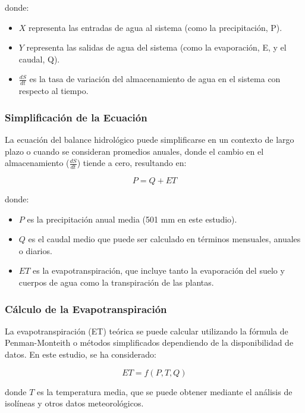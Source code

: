 \documentclass{article} %
\begin{document}
donde:

\begin{itemize}
    \item $X$ representa las entradas de agua al sistema (como la precipitación, P).
    \item $Y$ representa las salidas de agua del sistema (como la evaporación, E, y el caudal, Q).
    \item $\frac{dS}{dt}$ es la tasa de variación del almacenamiento de agua en el sistema con respecto al tiempo.
\end{itemize}

\subsubsection{Simplificación de la Ecuación}

La ecuación del balance hidrológico puede simplificarse en un contexto de largo plazo o cuando se consideran promedios anuales, donde el cambio en el almacenamiento ($\frac{dS}{dt}$) tiende a cero, resultando en:

\begin{equation}
    P = Q + ET
    \label{eq:evaporacion}
\end{equation}

donde:
\begin{itemize}
    \item $P$ es la precipitación anual media (501 mm en este estudio).
    \item $Q$ es el caudal medio que puede ser calculado en términos mensuales, anuales o diarios.
    \item $ET$ es la evapotranspiración, que incluye tanto la evaporación del suelo y cuerpos de agua como la transpiración de las plantas.
\end{itemize}

\subsubsection{Cálculo de la Evapotranspiración}

La evapotranspiración (ET) teórica se puede calcular utilizando la fórmula de Penman-Monteith o métodos simplificados dependiendo de la disponibilidad de datos. En este estudio, se ha considerado:

\begin{equation}
    ET = f(P, T, Q)
\end{equation}

donde $T$ es la temperatura media, que se puede obtener mediante el análisis de isolíneas y otros datos meteorológicos.
\end{document}
